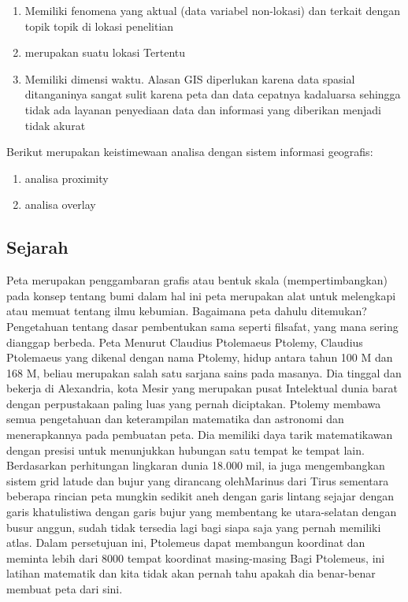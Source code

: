 \begin{enumerate}
\begin{enumerate}
\item Memiliki fenomena yang aktual (data variabel non-lokasi) dan terkait dengan topik topik di lokasi penelitian 
\item merupakan suatu lokasi Tertentu 
\item Memiliki dimensi waktu.  Alasan GIS diperlukan karena data spasial ditanganinya sangat sulit karena peta dan data cepatnya kadaluarsa sehingga tidak ada layanan penyediaan data dan informasi yang diberikan menjadi tidak akurat
\end{enumerate}
Berikut merupakan keistimewaan analisa dengan sistem informasi geografis:
\begin{enumerate}
\item analisa proximity
\item analisa overlay
\end{enumerate}
\subsection{Sejarah}
Peta merupakan penggambaran grafis atau bentuk skala (mempertimbangkan) pada konsep tentang bumi dalam hal ini peta merupakan alat untuk melengkapi atau memuat tentang ilmu kebumian.  Bagaimana peta dahulu ditemukan?  Pengetahuan tentang dasar pembentukan sama seperti filsafat, yang mana sering dianggap berbeda.  Peta Menurut Claudius Ptolemaeus Ptolemy, Claudius Ptolemaeus yang dikenal dengan nama Ptolemy, hidup antara tahun 100 M dan 168 M, beliau merupakan salah satu sarjana sains pada masanya.  Dia tinggal dan bekerja di Alexandria, kota Mesir yang merupakan pusat Intelektual dunia barat dengan perpustakaan paling luas yang pernah diciptakan.  Ptolemy membawa semua pengetahuan dan keterampilan matematika dan astronomi dan menerapkannya pada pembuatan peta.  Dia memiliki daya tarik matematikawan dengan presisi untuk menunjukkan hubungan satu tempat ke tempat lain.  Berdasarkan perhitungan lingkaran dunia 18.000 mil, ia juga mengembangkan sistem grid latude dan bujur yang dirancang olehMarinus dari Tirus sementara beberapa rincian peta mungkin sedikit aneh dengan garis lintang sejajar dengan garis khatulistiwa dengan garis bujur yang membentang ke utara-selatan dengan busur anggun, sudah tidak tersedia  lagi bagi siapa saja yang pernah memiliki atlas.  Dalam persetujuan ini, Ptolemeus dapat membangun koordinat dan meminta lebih dari 8000 tempat koordinat masing-masing Bagi Ptolemeus, ini latihan matematik dan kita tidak akan pernah tahu apakah dia benar-benar membuat peta dari sini.

\end{enumerate}
